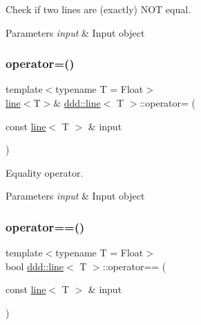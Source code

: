Check if two lines are (exactly) N\+OT equal. 


\begin{DoxyParams}{Parameters}
{\em input} & Input object \\
\hline
\end{DoxyParams}
\mbox{\label{classddd_1_1line_aaac9139569d98d11350a92cc33b960fa}} 
\subsubsection{\texorpdfstring{operator=()}{operator=()}}
{\footnotesize\ttfamily template$<$typename T = Float$>$ \\
\hyperlink{classddd_1_1line}{line}$<$T$>$\& \hyperlink{classddd_1_1line}{ddd\+::line}$<$ T $>$\+::operator= (\begin{DoxyParamCaption}\item[{const \hyperlink{classddd_1_1line}{line}$<$ T $>$ \&}]{input }\end{DoxyParamCaption})\hspace{0.3cm}{\ttfamily [inline]}}



Equality operator. 


\begin{DoxyParams}{Parameters}
{\em input} & Input object \\
\hline
\end{DoxyParams}
\mbox{\label{classddd_1_1line_aa1710ad864090b61a9f67e12e9f6986b}} 
\subsubsection{\texorpdfstring{operator==()}{operator==()}}
{\footnotesize\ttfamily template$<$typename T = Float$>$ \\
bool \hyperlink{classddd_1_1line}{ddd\+::line}$<$ T $>$\+::operator== (\begin{DoxyParamCaption}\item[{const \hyperlink{classddd_1_1line}{line}$<$ T $>$ \&}]{input }\end{DoxyParamCaption})\hspace{0.3cm}{\ttfamily [inline]}}




